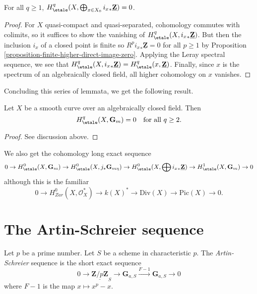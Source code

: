 \begin{lemma}
\label{lemma-cohomology-istar-Z}
For all $q \geq 1$, $H_\etale^q(X, \bigoplus_{x \in X_0} {i_x}_*
\underline{\mathbf{Z}}) = 0$.
\end{lemma}

\begin{proof}
For $X$ quasi-compact and quasi-separated, cohomology commutes with colimits,
so it suffices to show the vanishing of $H_\etale^q(X, {i_x}_*
\underline{\mathbf{Z}})$. But then the inclusion $i_x$ of a closed point is
finite so $R^p {i_x}_* \underline{\mathbf{Z}} = 0$ for all $p \geq 1$ by
Proposition \ref{proposition-finite-higher-direct-image-zero}.
Applying the Leray spectral sequence, we see that
$H_\etale^q(X, {i_x}_* \underline{\mathbf{Z}}) =
H_\etale^q(x, \underline{\mathbf{Z}})$.
Finally, since $x$ is the spectrum of an
algebraically closed field, all higher cohomology on $x$ vanishes.
\end{proof}

\noindent
Concluding this series of lemmata, we get the following result.

\begin{theorem}
\label{theorem-vanishing-cohomology-Gm-curve}
Let $X$ be a smooth curve over an algebraically closed field. Then
$$
H_\etale^q(X, \mathbf{G}_m) = 0 \ \ \text{ for all } q \geq 2.
$$
\end{theorem}

\begin{proof}
See discussion above.
\end{proof}

\noindent
We also get the cohomology long exact sequence
$$
0 \to
H_\etale^0(X, \mathbf{G}_m) \to
H_\etale^0(X, j_*\mathbf{G}_{m\eta}) \to
H_\etale^0(X, \bigoplus {i_x}_*\underline{\mathbf{Z}}) \to
H_\etale^1(X, \mathbf{G}_m) \to 0
$$
although this is the familiar
$$
0 \to H_{Zar}^0(X, \mathcal{O}_X^*) \to k(X)^* \to \text{Div}(X)
\to \text{Pic}(X) \to 0.
$$




\section{The Artin-Schreier sequence}
\label{section-artin-schreier}

\noindent
Let $p$ be a prime number. Let $S$ be a scheme in characteristic $p$.
The {\it Artin-Schreier} sequence is the short exact sequence
$$
0 \longrightarrow \underline{\mathbf{Z}/p\mathbf{Z}}_S \longrightarrow
\mathbf{G}_{a, S} \xrightarrow{F-1} \mathbf{G}_{a, S} \longrightarrow 0
$$
where $F - 1$ is the map $x \mapsto x^p - x$.

